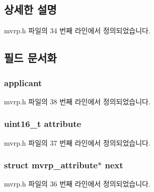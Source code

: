 \subsection{상세한 설명}


mvrp.\+h 파일의 34 번째 라인에서 정의되었습니다.



\subsection{필드 문서화}
\subsubsection[{\texorpdfstring{applicant}{applicant}}]{ applicant}\hypertarget{structmvrp__attribute_a9ee7e01253c78c410bf44f18a6372d92}{}\label{structmvrp__attribute_a9ee7e01253c78c410bf44f18a6372d92}


mvrp.\+h 파일의 38 번째 라인에서 정의되었습니다.

\subsubsection[{\texorpdfstring{attribute}{attribute}}]{\setlength{\rightskip}{0pt plus 5cm}uint16\+\_\+t attribute}\hypertarget{structmvrp__attribute_a3b3d3596e1475518967e76e0e222a458}{}\label{structmvrp__attribute_a3b3d3596e1475518967e76e0e222a458}


mvrp.\+h 파일의 37 번째 라인에서 정의되었습니다.

\subsubsection[{\texorpdfstring{next}{next}}]{\setlength{\rightskip}{0pt plus 5cm}struct {\bf mvrp\+\_\+attribute}$\ast$ next}\hypertarget{structmvrp__attribute_a6443b8a395d0b5481049fdb981ca012a}{}\label{structmvrp__attribute_a6443b8a395d0b5481049fdb981ca012a}


mvrp.\+h 파일의 36 번째 라인에서 정의되었습니다.

